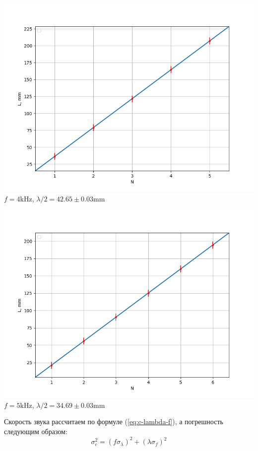 \documentclass[12pt]{article}
\begin{document}
\begin{minipage}[t]{.49\textwidth}
	\vspace{0pt}
	\centering
	\includegraphics[scale = 0.45]{O2_4.png}
	\small{$f = 4$kHz, $\lambda/2 = 42.65\pm0.03$mm}
\end{minipage}
\begin{minipage}[t]{.49\textwidth}
	\vspace{0mm}
	\centering
	\includegraphics[scale = 0.45]{O2_5.png}
	\small{$f = 5$kHz, $\lambda/2 = 34.69\pm0.03$mm}
\end{minipage}

Скорость звука рассчитаем по формуле (\ref{eq:c-lambda-f}), а погрешность следующим образом:
\begin{equation*}
	\sigma_c^2 = (f \sigma_{\lambda})^2 + (\lambda \sigma_{f})^2
\end{equation*}
\end{document}
